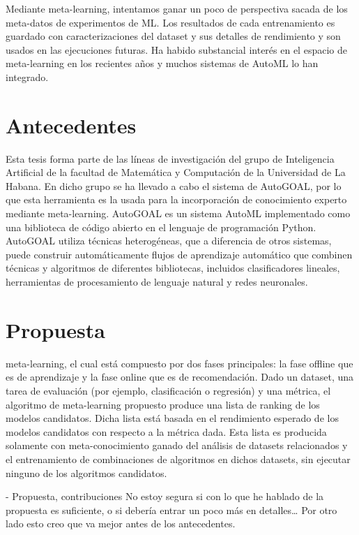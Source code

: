Mediante meta-learning, intentamos ganar un poco de perspectiva sacada de los meta-datos de experimentos de ML. Los resultados de cada entrenamiento es guardado con caracterizaciones del dataset y sus detalles de rendimiento y son usados en las ejecuciones futuras. Ha habido substancial interés en el espacio de meta-learning en los recientes años y muchos sistemas de AutoML lo han integrado.

\section{Antecedentes}

Esta tesis forma parte de las líneas de investigación del grupo de Inteligencia Artificial de la facultad de Matemática y Computación de la Universidad de La Habana. En dicho grupo se ha llevado a cabo el sistema de AutoGOAL,  por lo que esta herramienta es la usada para la incorporación de conocimiento experto mediante meta-learning. AutoGOAL es un sistema AutoML implementado como una biblioteca de código abierto en el lenguaje de programación Python. AutoGOAL utiliza técnicas heterogéneas, que a diferencia de otros sistemas, puede construir automáticamente flujos de aprendizaje automático que combinen técnicas y algoritmos de diferentes bibliotecas, incluidos clasificadores lineales, herramientas de procesamiento de lenguaje natural y redes neuronales.

\section{Propuesta}

meta-learning, el cual está compuesto por dos fases principales: la fase offline que es de aprendizaje y la fase online que es de recomendación. Dado un dataset, una tarea de evaluación (por ejemplo, clasificación o regresión) y una métrica, el algoritmo de meta-learning propuesto produce una lista de ranking de los modelos candidatos. Dicha lista está basada en el rendimiento esperado de los modelos candidatos con respecto a la métrica dada. Esta lista es producida solamente con meta-conocimiento ganado del análisis de datasets relacionados y el entrenamiento de combinaciones de algoritmos en dichos datasets, sin ejecutar ninguno de los algoritmos candidatos.

- Propuesta, contribuciones
No estoy segura si con lo que he hablado de la propuesta es suficiente, o si debería entrar un poco más en detalles… Por otro lado esto creo que va mejor antes de los antecedentes.

